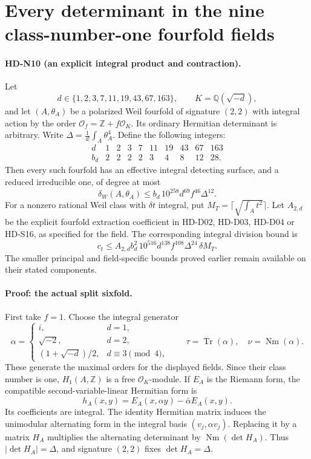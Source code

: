\section{Every determinant in the nine class-number-one fourfold fields}
\label{sec:all-fields-fourfolds}

\paragraph{HD-N10 (an explicit integral product and contraction).}
Let
\[
 d\in\{1,2,3,7,11,19,43,67,163\},\qquad K=\mathbb Q(\sqrt{-d}),
\]
and let $(A,\theta_A)$ be a polarized Weil fourfold of signature
$(2,2)$ with integral action by the order
$\mathcal O_f=\mathbb Z+f\mathcal O_K$. Its ordinary Hermitian
determinant is arbitrary. Write
$\Delta=\frac1{4!}\int_A\theta_A^4$. Define the following integers:
\[
\begin{array}{c|rrrrrrrrr}
d&1&2&3&7&11&19&43&67&163\\\hline
b_d&2&2&2&2&3&4&8&12&28.
\end{array}
\]
Then every such fourfold has an effective integral detecting surface,
and a reduced irreducible one, of degree at most
\[
 \boxed{\delta_W(A,\theta_A)
 \le b_d\,10^{258}d^{69}f^{46}\Delta^{12}.}                 \tag{N10.1}
\]
For a nonzero rational Weil class with $\delta t$ integral, put
$M_T=\lceil\sqrt{\int_A t^2}\rceil$. Let $A_{2,d}$ be the explicit
fourfold extraction coefficient in HD-D02, HD-D03, HD-D04 or HD-S16,
as specified for the field. The corresponding integral division bound is
\[
 \boxed{c_t\le A_{2,d}b_d^2\,10^{516}d^{138}
             f^{108}\Delta^{24}\,\delta M_T.}             \tag{N10.2}
\]
The smaller principal and field-specific bounds proved earlier remain
available on their stated components.

\paragraph{Proof: the actual split sixfold.}
First take $f=1$. Choose the integral generator
\[
 \alpha=\begin{cases}
 i,&d=1,\\
 \sqrt{-2},&d=2,\\
 (1+\sqrt{-d})/2,&d\equiv3\pmod4,
 \end{cases}
 \qquad \tau=\operatorname{Tr}(\alpha),\quad
 \nu=\operatorname{Nm}(\alpha).
\]
These generate the maximal orders for the displayed fields. Since
their class number is one, $H_1(A,\mathbb Z)$ is a free
$\mathcal O_K$-module. If $E_A$ is the Riemann form, the compatible
second-variable-linear Hermitian form is
\[
 h_A(x,y)=E_A(x,\alpha y)-\bar\alpha E_A(x,y).
\]
Its coefficients are integral. The identity Hermitian matrix induces
the unimodular alternating form in the integral basis
$(v_j,\alpha v_j)$. Replacing it by a matrix $H_A$ multiplies the
alternating determinant by $\operatorname{Nm}(\det H_A)$.
Thus $|\det H_A|=\Delta$, and signature $(2,2)$ fixes
$\det H_A=\Delta$.

